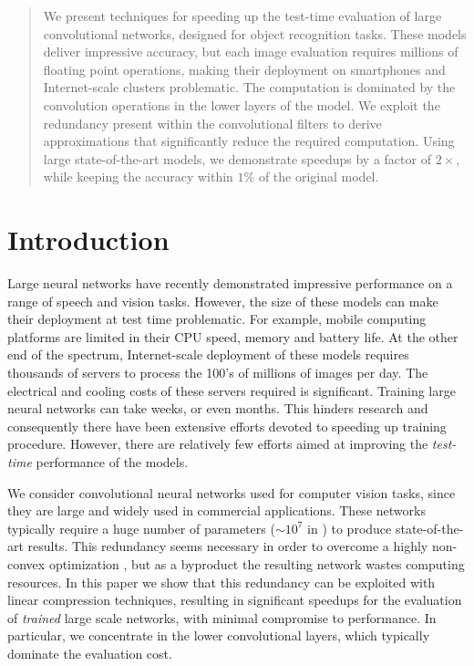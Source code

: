 \begin{abstract}
  We present techniques for speeding up the test-time evaluation of
  large convolutional networks, designed for object recognition
  tasks. These models deliver impressive accuracy, but each image
  evaluation requires millions of floating point operations, making
  their deployment on smartphones and Internet-scale clusters
  problematic. The computation is dominated by the convolution
  operations in the lower layers of the model. We exploit the redundancy
  present within the convolutional filters to derive
  approximations that significantly reduce the required
  computation. Using large state-of-the-art models, we demonstrate
  speedups by a factor of $2\times$, while keeping the accuracy
  within $1\%$ of the original model.
\end{abstract}

\section{Introduction}

Large neural networks have recently demonstrated impressive
performance on a range of speech and vision tasks. However, the size of
these models can make their deployment at test time problematic. For
example, mobile computing platforms are limited in their CPU speed,
memory and battery life. At the other end of the spectrum,
Internet-scale deployment of these models requires thousands of
servers to process the 100's of millions of images per day. The
electrical and cooling costs of these servers required is significant.
Training large neural networks can take weeks, or even
months. This hinders research and consequently there have been
extensive efforts devoted to speeding up training procedure.  However,
there are relatively few efforts aimed at improving the {\em test-time}
performance of the models. 

 We consider convolutional neural networks used for computer vision tasks, since
they are large and widely used in commercial applications. 
These networks typically require a huge number of parameters ($\sim 10^{7}$ in \cite{overfeat})
to produce state-of-the-art results. This redundancy seems necessary in order
to overcome a highly non-convex optimization \cite{denil2013predicting, hintonseparable}, 
but as a byproduct the resulting network wastes computing resources.
In this paper we show that this redundancy can be 
exploited with linear compression techniques,
resulting in significant speedups for the evaluation of {\em trained}
large scale networks, with minimal compromise to performance.
In particular, we concentrate in the lower convolutional layers, which 
typically dominate the evaluation cost. 

